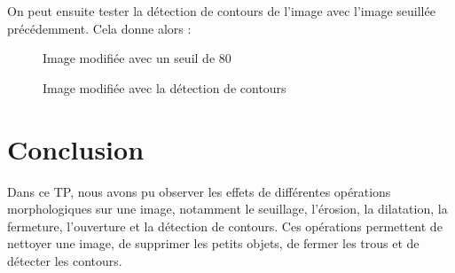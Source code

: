 \documentclass[french,a4paper,10pt]{article}
\begin{document}
	On peut ensuite tester la détection de contours de l'image avec l'image seuillée précédemment.
	Cela donne alors :
	\begin{figure}[!htb]
		\begin{minipage}{0.48\textwidth}
			\centering
			\caption{Image modifiée avec un seuil de 80}\label{Fig:test-grey-08-8}
		\end{minipage}\hfill
		\begin{minipage}{0.48\textwidth}
			\centering
			\caption{Image modifiée avec la détection de contours}\label{Fig:difference-test-grey-08}
		\end{minipage}
	\end{figure}

	\newpage
	\section{Conclusion}\label{sec:5}

	Dans ce TP, nous avons pu observer les effets de différentes opérations morphologiques sur une image,
	notamment le seuillage, l'érosion, la dilatation, la fermeture, l'ouverture et la détection de contours.
	Ces opérations permettent de nettoyer une image, de supprimer les petits objets, de fermer les trous et de détecter
	les contours.
\end{document}
